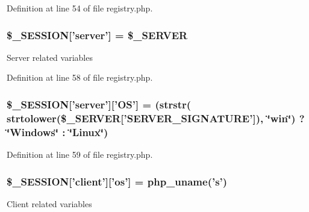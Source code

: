 \-Definition at line 54 of file registry.\-php.

\hypertarget{registry_8php_a51d6a13cdd0e8d991294b44591665e26}{
\subsubsection[{\$\-\_\-\-S\-E\-S\-S\-I\-O\-N}]{\setlength{\rightskip}{0pt plus 5cm}\$\-\_\-\-S\-E\-S\-S\-I\-O\-N\mbox{[}'server'\mbox{]} = \$\-\_\-\-S\-E\-R\-V\-E\-R}}\label{registry_8php_a51d6a13cdd0e8d991294b44591665e26}
\-Server related variables 

\-Definition at line 58 of file registry.\-php.

\hypertarget{registry_8php_aceddd1f9a4bcd79348e3fa464e806c82}{
\subsubsection[{\$\-\_\-\-S\-E\-S\-S\-I\-O\-N}]{\setlength{\rightskip}{0pt plus 5cm}\$\-\_\-\-S\-E\-S\-S\-I\-O\-N\mbox{[}'server'\mbox{]}\mbox{[}'\-O\-S'\mbox{]} = (strstr( strtolower(\$\-\_\-\-S\-E\-R\-V\-E\-R\mbox{[}'\-S\-E\-R\-V\-E\-R\-\_\-\-S\-I\-G\-N\-A\-T\-U\-R\-E'\mbox{]}), \char`\"{}win\char`\"{}) ? \char`\"{}\-Windows\char`\"{} \-: \char`\"{}\-Linux\char`\"{})}}\label{registry_8php_aceddd1f9a4bcd79348e3fa464e806c82}


\-Definition at line 59 of file registry.\-php.

\hypertarget{registry_8php_a970998bb254598c3f457e2ed2c2bc281}{
\subsubsection[{\$\-\_\-\-S\-E\-S\-S\-I\-O\-N}]{\setlength{\rightskip}{0pt plus 5cm}\$\-\_\-\-S\-E\-S\-S\-I\-O\-N\mbox{[}'client'\mbox{]}\mbox{[}'os'\mbox{]} = php\-\_\-uname('s')}}\label{registry_8php_a970998bb254598c3f457e2ed2c2bc281}
\-Client related variables 

